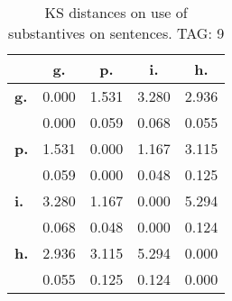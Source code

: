 \begin{table}[h!]
\begin{center}
\begin{tabular}{| l || c | c | c | c |}\hline
 & {\bf g.} & {\bf p.} & {\bf i.} & {\bf h.} \\\hline\hline
{\bf g.} & 0.000 & 1.531 & 3.280 & 2.936 \\
{\bf } & 0.000 & 0.059 & 0.068 & 0.055 \\\hline
{\bf p.} & 1.531 & 0.000 & 1.167 & 3.115 \\
{\bf } & 0.059 & 0.000 & 0.048 & 0.125 \\\hline
{\bf i.} & 3.280 & 1.167 & 0.000 & 5.294 \\
{\bf } & 0.068 & 0.048 & 0.000 & 0.124 \\\hline
{\bf h.} & 2.936 & 3.115 & 5.294 & 0.000 \\
{\bf } & 0.055 & 0.125 & 0.124 & 0.000 \\\hline
\end{tabular}
\caption{KS distances on use of substantives on sentences. TAG: 9}
\end{center}
\end{table}